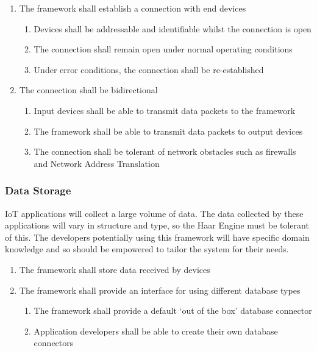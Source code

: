         \begin{enumerate}
          \item The framework shall establish a connection with end devices
          \begin{enumerate}
            \item Devices shall be addressable and identifiable whilst the connection is open
            \item The connection shall remain open under normal operating conditions
            \item Under error conditions, the connection shall be re-established
          \end{enumerate}
          \item The connection shall be bidirectional
          \begin{enumerate}
            \item Input devices shall be able to transmit data packets to the framework
            \item The framework shall be able to transmit data packets to output devices
            \item The connection shall be tolerant of network obstacles such as firewalls and Network Address Translation
          \end{enumerate}
        \end{enumerate}

      \subsubsection{Data Storage}
        IoT applications will collect a large volume of data. The data collected by these applications will vary in structure and type, so the Haar Engine must be tolerant of this. The developers potentially using this framework will have specific domain knowledge and so should be empowered to tailor the system for their needs.

        \begin{enumerate}
          \item The framework shall store data received by devices
          \item The framework shall provide an interface for using different database types
          \begin{enumerate}
            \item The framework shall provide a default `out of the box' database connector
            \item Application developers shall be able to create their own database connectors
          \end{enumerate}
        \end{enumerate}

